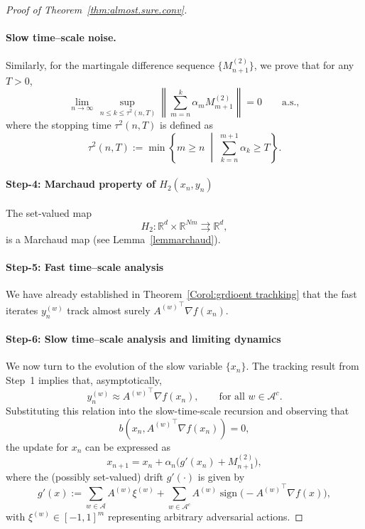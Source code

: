 \documentclass{article}
\begin{document}
\begin{proof}[Proof of Theorem~\ref{thm:almost.sure.conv}]
\paragraph{Slow time--scale noise.}
Similarly, for the martingale difference sequence \(\{M_{n+1}^{(2)}\}\), we prove that for any \(T>0\),
\begin{equation}
\lim_{n\to\infty}
\sup_{\, n\le k\le \tau^2(n,T)}
\left\|
\sum_{m=n}^{k}\alpha_m M_{m+1}^{(2)}
\right\|
=0
\qquad \text{a.s.},
\label{eq:noise_slow_vanish}
\end{equation}
where the stopping time \(\tau^2(n,T)\) is defined as
\begin{equation}
\tau^2(n,T)
:=
\min\left\{
m\ge n \;\middle|\;
\sum_{k=n}^{m+1}\alpha_k \ge T
\right\}.
\label{eq:tau_slow}
\end{equation}
\paragraph{Step-4: Marchaud property of \(H_2(x_n,y_n)\)}

The set-valued map
\[
H_2 : \mathbb{R}^d \times \mathbb{R}^{Nm} \rightrightarrows \mathbb{R}^d,
\]
is a Marchaud map (see Lemma~\ref{lemmarchaud}).
\paragraph{Step-5: Fast time--scale analysis}

We have already established in Theorem~\ref{Corol:grdioent trachking} that the fast iterates \(y_n^{(w)}\) track almost surely \({A^{(w)}}^\top \nabla f(x_n)\).

\paragraph{Step-6: Slow time--scale analysis and limiting dynamics}

We now turn to the evolution of the slow variable \(\{x_n\}\). The tracking result from Step~1 implies that, asymptotically,
\[
y_n^{(w)} \approx {A^{(w)}}^\top \nabla f(x_n),
\qquad \text{for all } w \in \mathcal{A}^c.
\]
Substituting this relation into the slow-time-scale recursion and observing that
\[
b\!\left(x_n,{A^{(w)}}^\top \nabla f(x_n)\right)=0,
\]
the update for \(x_n\) can be expressed as
\[
x_{n+1}
=
x_n
+
\alpha_n\big(g'(x_n)+M_{n+1}^{(2)}\big),
\]
where the (possibly set-valued) drift \(g'(\cdot)\) is given by
\[
g'(x)
:=
\sum_{w \in \mathcal{A}}
A^{(w)}\xi^{(w)}
+
\sum_{w \in \mathcal{A}^c}
A^{(w)}
\operatorname{sign}\!\big(-{A^{(w)}}^\top \nabla f(x)\big),
\]
with \(\xi^{(w)} \in [-1,1]^m\) representing arbitrary adversarial actions.


\end{proof}
\end{document}
